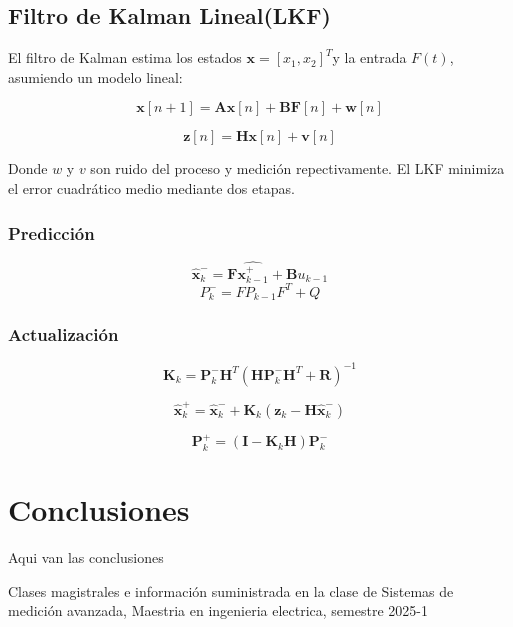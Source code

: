 \documentclass[conference]{IEEEtran}
\begin{document}
\subsection{Filtro de Kalman Lineal(LKF)}

El filtro de Kalman estima los estados $\textbf{x} = [x_1, x_2]^T$y la entrada $F(t)$, asumiendo un modelo lineal:

\[
	\mathbf{x}[n + 1] = \textbf{A} \textbf{x}[n] + \textbf{B}\textbf{F}[n] + \textbf{w} [n]
\]

\[
	\textbf{z}[n] = \textbf{H} \textbf{x}[n] + \textbf{v}[n]
\]

Donde $w$ y $v$ son ruido del proceso y medici\'on repectivamente. El LKF minimiza el error cuadr\'atico medio mediante dos etapas.

\subsubsection{Predicci\'on}


\[
	\hat{\mathbf{x}}_k^- = \mathbf{F}\hat{\mathbf{x}^+_{k-1}} + \mathbf{B}u_{k-1}
\]
\[
	P^-_k = F P_{k-1}F^T + Q
\]

\subsubsection{Actualizaci\'on}

\[
	\mathbf{K}_k = \mathbf{P}_k^- \mathbf{H}^T \left( \mathbf{H} \mathbf{P}_k^- \mathbf{H}^T + \mathbf{R} \right)^{-1}
\]

\[
	\hat{\mathbf{x}}_k^+ = \hat{\mathbf{x}}_k^- + \mathbf{K}_k \left( \mathbf{z}_k - \mathbf{H} \hat{\mathbf{x}}_k^- \right)	
\]

\[
	\mathbf{P}_k^+ = \left( \mathbf{I} - \mathbf{K}_k \mathbf{H} \right) \mathbf{P}_k^-
\]

\section{Conclusiones}

Aqui van las conclusiones

\begin{thebibliography}{00}

\item Clases magistrales e información suministrada en la clase de Sistemas de medición avanzada, Maestria en ingenieria electrica, semestre 2025-1

\end{thebibliography}
\end{document}
